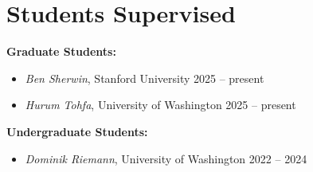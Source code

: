 \section{Students Supervised}

\textbf{Graduate Students:}
\begin{itemize}
    \item \textit{Ben Sherwin}, Stanford University \hfill 2025 -- present
    \item \textit{Hurum Tohfa}, University of Washington \hfill 2025 -- present
\end{itemize}

\textbf{Undergraduate Students:}
\begin{itemize}
    \item \textit{Dominik Riemann}, University of Washington \hfill 2022 -- 2024
\end{itemize}